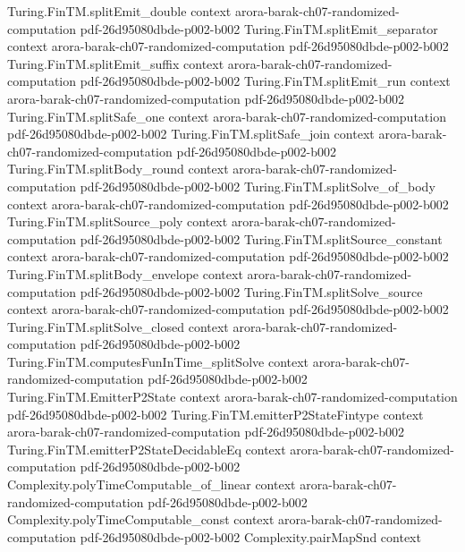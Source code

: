 \begin{theorem}
\proofstep
  {Turing.FinTM.splitEmit_double}
  {context}
  {arora-barak-ch07-randomized-computation}
  {pdf-26d95080dbde-p002-b002}
\proofstep
  {Turing.FinTM.splitEmit_separator}
  {context}
  {arora-barak-ch07-randomized-computation}
  {pdf-26d95080dbde-p002-b002}
\proofstep
  {Turing.FinTM.splitEmit_suffix}
  {context}
  {arora-barak-ch07-randomized-computation}
  {pdf-26d95080dbde-p002-b002}
\proofstep
  {Turing.FinTM.splitEmit_run}
  {context}
  {arora-barak-ch07-randomized-computation}
  {pdf-26d95080dbde-p002-b002}
\proofstep
  {Turing.FinTM.splitSafe_one}
  {context}
  {arora-barak-ch07-randomized-computation}
  {pdf-26d95080dbde-p002-b002}
\proofstep
  {Turing.FinTM.splitSafe_join}
  {context}
  {arora-barak-ch07-randomized-computation}
  {pdf-26d95080dbde-p002-b002}
\proofstep
  {Turing.FinTM.splitBody_round}
  {context}
  {arora-barak-ch07-randomized-computation}
  {pdf-26d95080dbde-p002-b002}
\proofstep
  {Turing.FinTM.splitSolve_of_body}
  {context}
  {arora-barak-ch07-randomized-computation}
  {pdf-26d95080dbde-p002-b002}
\proofstep
  {Turing.FinTM.splitSource_poly}
  {context}
  {arora-barak-ch07-randomized-computation}
  {pdf-26d95080dbde-p002-b002}
\proofstep
  {Turing.FinTM.splitSource_constant}
  {context}
  {arora-barak-ch07-randomized-computation}
  {pdf-26d95080dbde-p002-b002}
\proofstep
  {Turing.FinTM.splitBody_envelope}
  {context}
  {arora-barak-ch07-randomized-computation}
  {pdf-26d95080dbde-p002-b002}
\proofstep
  {Turing.FinTM.splitSolve_source}
  {context}
  {arora-barak-ch07-randomized-computation}
  {pdf-26d95080dbde-p002-b002}
\proofstep
  {Turing.FinTM.splitSolve_closed}
  {context}
  {arora-barak-ch07-randomized-computation}
  {pdf-26d95080dbde-p002-b002}
\proofstep
  {Turing.FinTM.computesFunInTime_splitSolve}
  {context}
  {arora-barak-ch07-randomized-computation}
  {pdf-26d95080dbde-p002-b002}
\proofstep
  {Turing.FinTM.EmitterP2State}
  {context}
  {arora-barak-ch07-randomized-computation}
  {pdf-26d95080dbde-p002-b002}
\proofstep
  {Turing.FinTM.emitterP2StateFintype}
  {context}
  {arora-barak-ch07-randomized-computation}
  {pdf-26d95080dbde-p002-b002}
\proofstep
  {Turing.FinTM.emitterP2StateDecidableEq}
  {context}
  {arora-barak-ch07-randomized-computation}
  {pdf-26d95080dbde-p002-b002}
\proofstep
  {Complexity.polyTimeComputable_of_linear}
  {context}
  {arora-barak-ch07-randomized-computation}
  {pdf-26d95080dbde-p002-b002}
\proofstep
  {Complexity.polyTimeComputable_const}
  {context}
  {arora-barak-ch07-randomized-computation}
  {pdf-26d95080dbde-p002-b002}
\proofstep
  {Complexity.pairMapSnd}
  {context}

\end{theorem}
